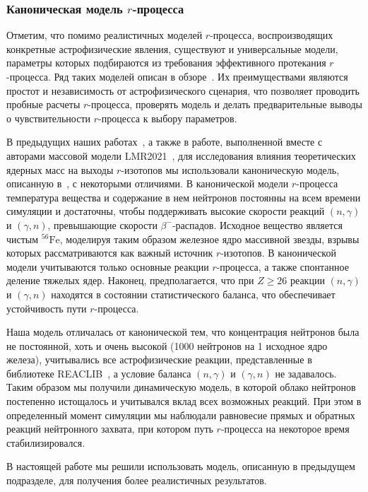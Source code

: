 \subsubsection{Каноническая модель $r$-процесса}
Отметим, что помимо реалистичных моделей $r$-процесса, воспроизводящих конкретные астрофизические явления, существуют и универсальные модели, параметры которых подбираются из требования эффективного протекания $r$-процесса. Ряд таких моделей описан в обзоре~\cite{arnould2007}. Их преимуществами являются простот и независимость от астрофизического сценария, что позволяет проводить пробные расчеты $r$-процесса, проверять модель и делать предварительные выводы о чувствительности $r$-процесса к выбору параметров.

В предыдущих наших работах~\cite{my-vestnik2021,my-iran2022,my-pos2022}, а также в работе, выполненной вместе с авторами массовой модели LMR2021~\cite{vladimirova2022}, для исследования влияния теоретических ядерных масс на выходы $r$-изотопов мы использовали каноническую модель, описанную в~\cite{arnould2007}, с некоторыми отличиями. В канонической модели $r$-процесса температура вещества и содержание в нем нейтронов постоянны на всем времени симуляции и достаточны, чтобы поддерживать высокие скорости реакций $(n,\gamma)$ и $(\gamma,n)$, превышающие скорости $\beta^-$-распадов. Исходное вещество является чистым ${}^{56}\text{Fe}$, моделируя таким образом железное ядро массивной звезды, взрывы которых рассматриваются как важный источник $r$-изотопов. В канонической модели учитываются только основные реакции $r$-процесса, а также спонтанное деление тяжелых ядер. Наконец, предполагается, что при $Z \geq 26$ реакции $(n,\gamma)$ и $(\gamma,n)$ находятся в состоянии статистического баланса, что обеспечивает устойчивость пути $r$-процесса.

Наша модель отличалась от канонической тем, что концентрация нейтронов была не постоянной, хоть и очень высокой (1000 нейтронов на 1 исходное ядро железа), учитывались все астрофизические реакции, представленные в библиотеке REACLIB~\cite{reaclib2010}, а условие баланса $(n,\gamma)$ и $(\gamma,n)$ не задавалось. Таким образом мы получили динамическую модель, в которой облако нейтронов постепенно истощалось и учитывался вклад всех возможных реакций. При этом в определенный момент симуляции мы наблюдали равновесие прямых и обратных реакций нейтронного захвата, при котором путь $r$-процесса на некоторое время стабилизировался.

В настоящей работе мы решили использовать модель, описанную в предыдущем подразделе, для получения более реалистичных результатов.
